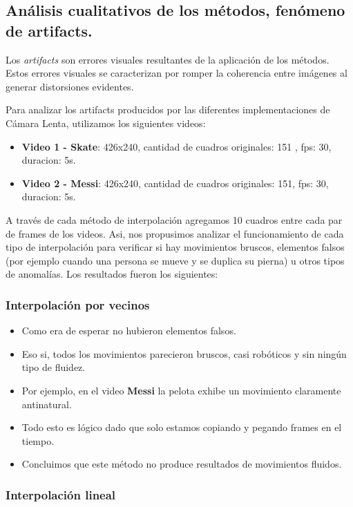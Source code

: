\subsection{Análisis cualitativos de los métodos, fenómeno de artifacts.}
Los \textit{artifacts} son errores visuales resultantes de la aplicación de los métodos. Estos errores visuales se caracterizan por romper la coherencia entre imágenes al generar distorsiones evidentes.

Para analizar los artifacts producidos por las diferentes implementaciones de Cámara Lenta, utilizamos los siguientes videos:

\begin{itemize}
  \item \textbf{Video 1 - Skate}: 426x240, cantidad de cuadros originales: 151 , fps: 30, duracion: 5s.
  \item \textbf{Video 2 - Messi}: 426x240, cantidad de cuadros originales: 151, fps: 30, duracion: 5s.
\end{itemize}

A través de cada método de interpolación agregamos 10 cuadros entre cada par de frames de los videos.
Asi, nos propusimos analizar el funcionamiento de cada tipo de interpolación para verificar si hay movimientos bruscos, elementos falsos (por ejemplo cuando una persona se mueve y se duplica su pierna) u otros tipos de anomalías.
Los resultados fueron los siguientes:

\subsubsection{Interpolación por vecinos}

\begin{itemize}
\item Como era de esperar no hubieron elementos falsos.
\item Eso si, todos los movimientos parecieron bruscos, casi robóticos y sin ningún tipo de fluidez.
\item Por ejemplo, en el video \textbf{Messi} la pelota exhibe un movimiento claramente antinatural.
\item Todo esto es lógico dado que solo estamos copiando y pegando frames en el tiempo.
\item Concluimos que este método no produce resultados de movimientos fluidos.
\end{itemize}

\subsubsection{Interpolación lineal}

